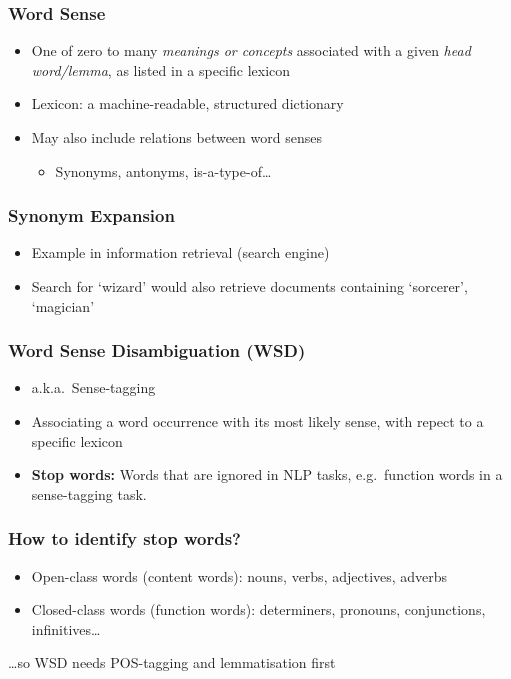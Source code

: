 \begin{frame}
\frametitle{Word Sense}
    
\begin{itemize}
\item One of zero to many \emph{meanings or concepts} associated with a given \emph{head word/lemma}, as listed in a specific lexicon
\item Lexicon: a machine-readable, structured dictionary
\item May also include relations between word senses
	\begin{itemize}
	\item Synonyms, antonyms, is-a-type-of\ldots
	\end{itemize}
\end{itemize}

\end{frame}


\begin{frame}
\frametitle{Synonym Expansion}
    
\begin{itemize}
\item Example in information retrieval (search engine)
\item Search for `wizard' would also retrieve documents containing `sorcerer', `magician'
\end{itemize}

\end{frame}


\begin{frame}
\frametitle{Word Sense Disambiguation (WSD)}

\begin{itemize}
\item a.k.a.~Sense-tagging
\item Associating a word occurrence with its most likely sense, with repect to a specific lexicon
\item \textbf{Stop words:} Words that are ignored in NLP tasks, e.g.~function words in a sense-tagging task.
\end{itemize}
\end{frame}

\begin{frame}
\frametitle{How to identify stop words?}

\begin{itemize}
\item Open-class words (content words): nouns, verbs, adjectives, adverbs
\item Closed-class words (function words): determiners, pronouns, conjunctions, infinitives\ldots
\end{itemize}

\ldots so WSD needs POS-tagging and lemmatisation first

\end{frame}

